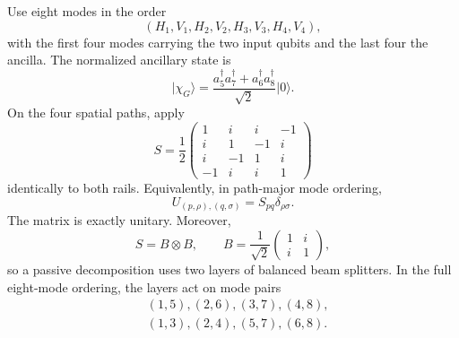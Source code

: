 \documentclass[11pt]{article}
\theoremstyle{remark}
\newcommand{\ket}[1]{\lvert #1\rangle}
\begin{document}
Use eight modes in the order
\begin{equation}
  (H_1,V_1,H_2,V_2,H_3,V_3,H_4,V_4),
\end{equation}
with the first four modes carrying the two input qubits and the last four the
ancilla. The normalized ancillary state is
\begin{equation}
  \ket{\chi_G}
   =\frac{a_5^\dagger a_7^\dagger+a_6^\dagger a_8^\dagger}{\sqrt2}\ket0.
  \label{eq:griceanc}
\end{equation}
On the four spatial paths, apply
\begin{equation}
  S=\frac12
  \begin{pmatrix}
  1&i&i&-1\\
  i&1&-1&i\\
  i&-1&1&i\\
  -1&i&i&1
  \end{pmatrix}
  \label{eq:S}
\end{equation}
identically to both rails. Equivalently, in path-major mode ordering,
\begin{equation}
  U_{(p,\rho),(q,\sigma)}=S_{pq}\delta_{\rho\sigma}.
\end{equation}
The matrix is exactly unitary. Moreover,
\begin{equation}
  S=B\otimes B,
  \qquad
  B=\frac1{\sqrt2}\begin{pmatrix}1&i\\ i&1\end{pmatrix},
  \label{eq:BS}
\end{equation}
so a passive decomposition uses two layers of balanced beam splitters. In the
full eight-mode ordering, the layers act on mode pairs
\begin{align}
  &(1,5),(2,6),(3,7),(4,8),\\
  &(1,3),(2,4),(5,7),(6,8).
\end{align}
\end{document}
